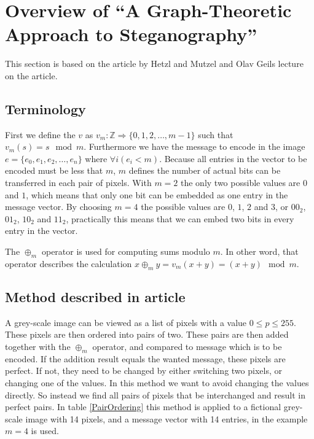 \clearpage
\section{Overview of ``A Graph-Theoretic Approach to Steganography''}
\label{sec:graphtheory}
\footnotesize{This section is based on the article by Hetzl and Mutzel\citep{hetzl_2005} and Olav Geils lecture on the article.}

\subsection*{Terminology}
First we define the $v$ as $ v_m: \mathds{Z} \Rightarrow \{0,1,2,\ldots,m-1\} $ such that $ v_m(s) = s \mod m $. Furthermore we have the message to encode in the image $e = \{ e_0, e_1, e_2, \ldots, e_n \}$ where $\forall i\left( e_i < m \right)$. Because all entries in the vector to be encoded must be less that $m$, $m$ defines the number of actual bits can be transferred in each pair of pixels. With $m = 2$ the only two possible values are $0$ and $1$, which means that only one bit can be embedded as one entry in the message vector. By choosing $m = 4$ the possible values are $0$, $1$, $2$ and $3$, or $00_2$, $01_2$, $10_2$ and $11_2$, practically this means that we can embed two bits in every entry in the vector.

The $\oplus_m$ operator is used for computing sums modulo $m$. In other word, that operator describes the calculation $x \oplus_m y = v_m(x + y) = (x + y) \mod m$.  

\subsection*{Method described in article}

A grey-scale image can be viewed as a list of pixels with a value $0 \leq p \leq 255$. These pixels are then ordered into pairs of two. These pairs are then added together with the $\oplus_m$ operator, and compared to message which is to be encoded. If the addition result equals the wanted message, these pixels are perfect. If not, they need to be changed by either switching two pixels, or changing one of the values. In this method we want to avoid changing the values directly. So instead we find all pairs of pixels that be interchanged and result in perfect pairs. In table \ref{PairOrdering} this method is applied to a fictional grey-scale image with 14 pixels, and a message vector with 14 entries, in the example $m=4$ is used. 

